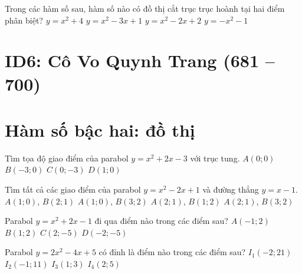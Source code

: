 \begin{ex}%
	Trong các hàm số sau, hàm số nào có đồ thị cắt trục trục hoành tại hai điểm phân biệt?
	\choice
	{$y=x^2+4$}
	{\True $y=x^2-3x+1$}
	{$y=x^2-2x+2$}
	{$y=-x^2-1$}
\end{ex}


\section*{ID6: Cô Vo Quynh Trang (681 -- 700)}
\section{Hàm số bậc hai: đồ thị}
\begin{ex}%
	Tìm tọa độ giao điểm của parabol $y=x^2+2x-3$ với trục tung.
	\choice
	{$A(0;0)$}
	{$B(-3;0)$}
	{\True $C(0;-3)$}
	{$D(1;0)$}
\end{ex}

\begin{ex}%
	Tìm tất cả các giao điểm của parabol $y=x^2-2x+1$ và đường thẳng $y=x-1$.
	\choice
	{\True $A(1;0)$, $B(2;1)$}
	{$A(1;0)$, $B(3;2)$}
	{$A(2;1)$, $B(1;2)$}
	{$A(2;1)$, $B(3;2)$}
\end{ex}

\begin{ex}%
	Parabol $y=x^2+2x-1$ đi qua điểm nào trong các điểm sau?
	\choice
	{$A(-1;2)$}
	{\True $B(1;2)$}
	{$C(2;-5)$}
	{$D(-2;-5)$}
\end{ex}

\begin{ex}%
	Parabol $y=2x^2-4x+5$ có đỉnh là điểm nào trong các điểm sau?
	\choice
	{$I_1(-2;21)$}
	{$I_2(-1;11)$}
	{\True $I_3(1;3)$}
	{$I_4(2;5)$}
\end{ex}

